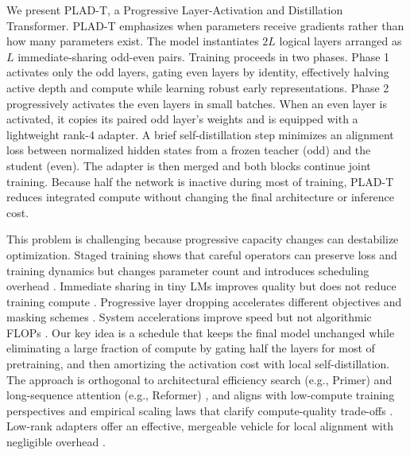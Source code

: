 \documentclass{article}
\begin{document}
We present PLAD-T, a Progressive Layer-Activation and Distillation Transformer. PLAD-T emphasizes when parameters receive gradients rather than how many parameters exist. The model instantiates \(2L\) logical layers arranged as \(L\) immediate-sharing odd-even pairs. Training proceeds in two phases. Phase 1 activates only the odd layers, gating even layers by identity, effectively halving active depth and compute while learning robust early representations. Phase 2 progressively activates the even layers in small batches. When an even layer is activated, it copies its paired odd layer’s weights and is equipped with a lightweight rank-4 adapter. A brief self-distillation step minimizes an alignment loss between normalized hidden states from a frozen teacher (odd) and the student (even). The adapter is then merged and both blocks continue joint training. Because half the network is inactive during most of training, PLAD-T reduces integrated compute without changing the final architecture or inference cost.

This problem is challenging because progressive capacity changes can destabilize optimization. Staged training shows that careful operators can preserve loss and training dynamics but changes parameter count and introduces scheduling overhead \cite{shen-2022-staged}. Immediate sharing in tiny LMs improves quality but does not reduce training compute \cite{liu-2024-mobilellm}. Progressive layer dropping accelerates different objectives and masking schemes \cite{zhang-2020-accelerating}. System accelerations improve speed but not algorithmic FLOPs \cite{andoorveedu-2022-tempo,narayanan-2020-memory,jia-2024-toward}. Our key idea is a schedule that keeps the final model unchanged while eliminating a large fraction of compute by gating half the layers for most of pretraining, and then amortizing the activation cost with local self-distillation. The approach is orthogonal to architectural efficiency search (e.g., Primer) and long-sequence attention (e.g., Reformer) \cite{so-2021-searching,kitaev-2020-reformer}, and aligns with low-compute training perspectives and empirical scaling laws that clarify compute-quality trade-offs \cite{geiping-2022-cramming,henighan-2020-scaling}. Low-rank adapters offer an effective, mergeable vehicle for local alignment with negligible overhead \cite{miles-2024-velora}.
\end{document}
